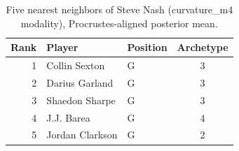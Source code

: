 \begin{table}[htbp]
  \centering\small
  \begin{tabular}{rllc}
    \toprule
    Rank & Player & Position & Archetype \\
    \midrule
    1 & Collin Sexton & G & 3 \\
    2 & Darius Garland & G & 3 \\
    3 & Shaedon Sharpe & G & 3 \\
    4 & J.J. Barea & G & 4 \\
    5 & Jordan Clarkson & G & 2 \\
    \bottomrule
  \end{tabular}
  \caption{Five nearest neighbors of Steve Nash (curvature_m4 modality), Procrustes-aligned posterior mean.}
  \label{tab:Steve_Nash_neighbors_curvature_m4}
\end{table}


